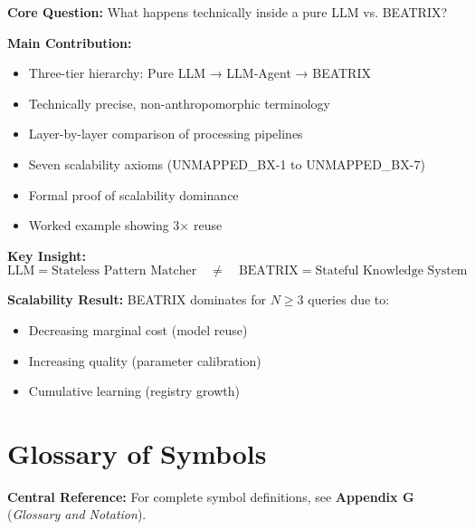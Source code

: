 \begin{tcolorbox}[colback=green!10!white, colframe=green!75!black,
    title=\textbf{Appendix UNMAPPED_BX: Summary}]

\textbf{Core Question:} What happens technically inside a pure LLM vs. BEATRIX?

\textbf{Main Contribution:}
\begin{itemize}[nosep]
    \item Three-tier hierarchy: Pure LLM → LLM-Agent → BEATRIX
    \item Technically precise, non-anthropomorphic terminology
    \item Layer-by-layer comparison of processing pipelines
    \item Seven scalability axioms (UNMAPPED_BX-1 to UNMAPPED_BX-7)
    \item Formal proof of scalability dominance
    \item Worked example showing 3$\times$ reuse
\end{itemize}

\textbf{Key Insight:}
\begin{equation}
\text{LLM} = \text{Stateless Pattern Matcher} \quad \neq \quad \text{BEATRIX} = \text{Stateful Knowledge System}
\end{equation}

\textbf{Scalability Result:} BEATRIX dominates for $N \geq 3$ queries due to:
\begin{itemize}[nosep]
    \item Decreasing marginal cost (model reuse)
    \item Increasing quality (parameter calibration)
    \item Cumulative learning (registry growth)
\end{itemize}

\end{tcolorbox}


\section{Glossary of Symbols}
\label{sec:bx-glossary}

\begin{tcolorbox}[colback=blue!5!white, colframe=blue!75!black]
\textbf{Central Reference:} For complete symbol definitions, see
\textbf{Appendix G} (\textit{Glossary and Notation}).
\end{tcolorbox}

